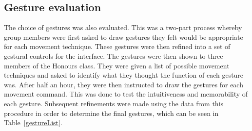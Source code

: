\subsection{Gesture evaluation}
The choice of gestures was also evaluated. This was a two-part process whereby group members were first asked to draw gestures they felt would be appropriate for each movement technique. These gestures were then refined into a set of gestural controls for the interface. The gestures were then shown to three members of the Honours class. They were given a list of possible movement techniques and asked to identify what they thought the function of each gesture was. After half an hour, they were then instructed to draw the gestures for each movement command. This was done to test the intuitiveness and memorability of each gesture. Subsequent refinements were made using the data from this procedure in order to determine the final gestures, which can be seen in Table~\ref{gestureList}.



